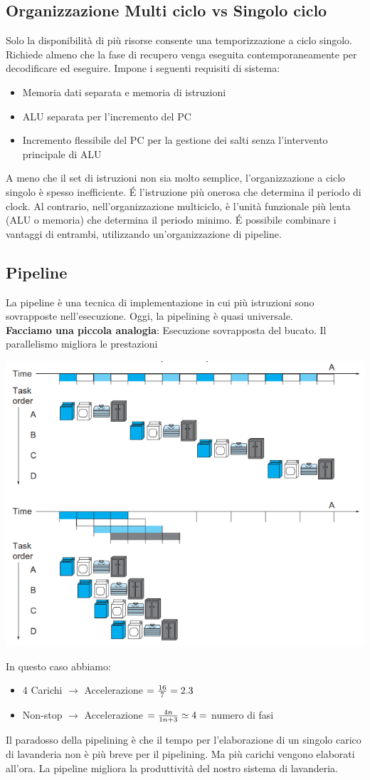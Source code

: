 \documentclass[12pt,a4paper]{article}
\begin{document}
\subsection{Organizzazione Multi ciclo vs Singolo ciclo}
Solo la disponibilità di più risorse consente una temporizzazione a ciclo singolo. Richiede almeno che la fase di recupero venga eseguita contemporaneamente per decodificare ed eseguire. Impone i seguenti requisiti di sistema:
\begin{itemize}
\item Memoria dati separata e memoria di istruzioni
\item ALU separata per l'incremento del PC
\item Incremento flessibile del PC per la gestione dei salti senza l'intervento principale di ALU
\end{itemize}
A meno che il set di istruzioni non sia molto semplice, l'organizzazione a ciclo singolo è spesso inefficiente. \'E l'istruzione più onerosa che determina il periodo di clock. Al contrario, nell'organizzazione multiciclo, è l'unità funzionale più lenta (ALU o memoria) che determina il periodo minimo. \'E possibile combinare i vantaggi di entrambi, utilizzando un'organizzazione di pipeline.

\subsection{Pipeline}
La pipeline è una tecnica di implementazione in cui più istruzioni sono sovrapposte nell'esecuzione. Oggi, la pipelining è quasi universale.\\
\textbf{Facciamo una piccola analogia}: Esecuzione sovrapposta del bucato. Il parallelismo migliora le prestazioni
\begin{center}
\includegraphics[width=0.6\columnwidth]{img/pipeline.png}
\end{center}
In questo caso abbiamo:
\begin{itemize}
\item 4 Carichi $\rightarrow$ Accelerazione $= {16 \over 7} = 2.3$
\item Non-stop $\rightarrow$ Accelerazione $={4n \over 1n + 3} \simeq 4 =$ numero di fasi
\end{itemize}
Il paradosso della pipelining è che il tempo per l'elaborazione di un singolo carico di lavanderia non è più breve per il pipelining.
Ma più carichi vengono elaborati all'ora. La pipeline migliora la produttività del nostro sistema di lavanderia.
\end{document}
